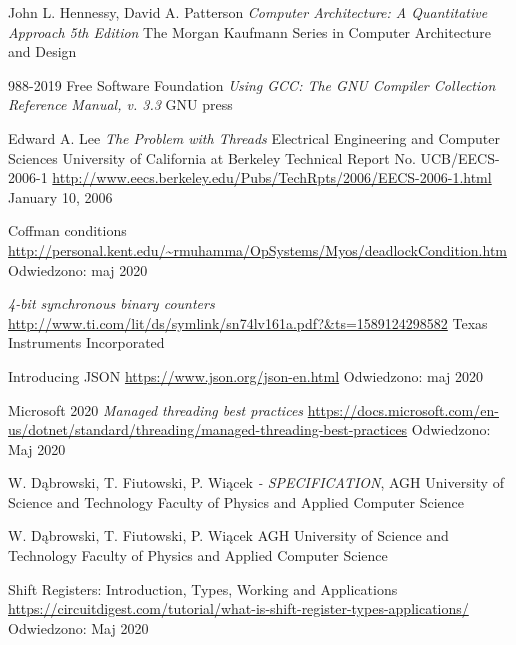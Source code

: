 \documentclass[a4paper,12pt]{article}
\begin{document}
\newpage
\begin{thebibliography}{99}

        John L. Hennessy, David A. Patterson 
        \textit{Computer Architecture: A Quantitative Approach  5th Edition }
        The Morgan Kaufmann Series in Computer Architecture and Design

        988-2019 Free Software Foundation
        \textit{Using GCC: The GNU Compiler Collection Reference Manual, v. 3.3}
        GNU press

        Edward A. Lee
        \textit{The Problem with Threads}
        Electrical Engineering and Computer Sciences
        University of California at Berkeley
        Technical Report No. UCB/EECS-2006-1
        \url{http://www.eecs.berkeley.edu/Pubs/TechRpts/2006/EECS-2006-1.html}
        January 10, 2006

        Coffman conditions
        \url{http://personal.kent.edu/~rmuhamma/OpSystems/Myos/deadlockCondition.htm}
        Odwiedzono: maj 2020

        \textit{4-bit synchronous binary counters}
        \url{http://www.ti.com/lit/ds/symlink/sn74lv161a.pdf?&ts=1589124298582}
        Texas Instruments Incorporated
        

        Introducing JSON
        \url{https://www.json.org/json-en.html}
        Odwiedzono: maj 2020

        Microsoft 2020
        \textit{Managed threading best practices}
        \url{https://docs.microsoft.com/en-us/dotnet/standard/threading/managed-threading-best-practices}
        Odwiedzono: Maj 2020
        
	W. Dąbrowski, T. Fiutowski, P. Wiącek 
	\textit{ - SPECIFICATION},
	AGH University of Science and Technology
        Faculty of Physics and Applied Computer Science 

	W. Dąbrowski, T. Fiutowski, P. Wiącek 
        \textit{}
        AGH University of Science and Technology
        Faculty of Physics and Applied Computer Science 

        Shift Registers: Introduction, Types, Working and Applications
        \url{https://circuitdigest.com/tutorial/what-is-shift-register-types-applications/}
        Odwiedzono: Maj 2020


\end{thebibliography}
\end{document}
